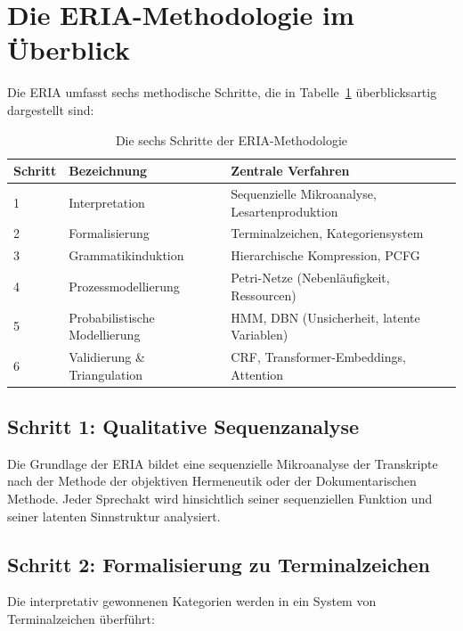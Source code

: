 \documentclass[12pt,a4paper]{article}
\begin{document}
\section{Die ERIA-Methodologie im Überblick}

Die ERIA umfasst sechs methodische Schritte, die in Tabelle~\ref{tab:schritte} 
überblicksartig dargestellt sind:

\begin{table}[H]
\centering
\caption{Die sechs Schritte der ERIA-Methodologie}
\label{tab:schritte}
\begin{tabular}{@{} p{2.5cm} p{3cm} p{7cm} @{}}
\toprule
\textbf{Schritt} & \textbf{Bezeichnung} & \textbf{Zentrale Verfahren} \\
\midrule
1 & Interpretation & Sequenzielle Mikroanalyse, Lesartenproduktion \\
2 & Formalisierung & Terminalzeichen, Kategoriensystem \\
3 & Grammatikinduktion & Hierarchische Kompression, PCFG \\
4 & Prozessmodellierung & Petri-Netze (Nebenläufigkeit, Ressourcen) \\
5 & Probabilistische Modellierung & HMM, DBN (Unsicherheit, latente Variablen) \\
6 & Validierung \& Triangulation & CRF, Transformer-Embeddings, Attention \\
\bottomrule
\end{tabular}
\end{table}

\subsection{Schritt 1: Qualitative Sequenzanalyse}

Die Grundlage der ERIA bildet eine sequenzielle Mikroanalyse der Transkripte 
nach der Methode der objektiven Hermeneutik oder der Dokumentarischen Methode. 
Jeder Sprechakt wird hinsichtlich seiner sequenziellen Funktion und seiner 
latenten Sinnstruktur analysiert.

\subsection{Schritt 2: Formalisierung zu Terminalzeichen}

Die interpretativ gewonnenen Kategorien werden in ein System von Terminalzeichen 
überführt:
\end{document}
